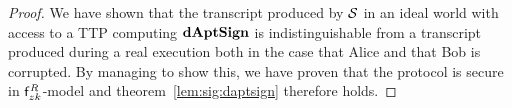 \begin{proof}
    We have shown that the transcript produced by $\mathcal{S}$ in an ideal world with access to a TTP computing $\mathbf{dAptSign}$ is indistinguishable from a transcript produced during a real execution both in the case that Alice and that Bob is corrupted.
    By managing to show this, we have proven that the protocol is secure in $\mathsf{f}^{\mathit{R}}_{zk}$-model and theorem~\cref{lem:sig:daptsign} therefore holds.
\end{proof}